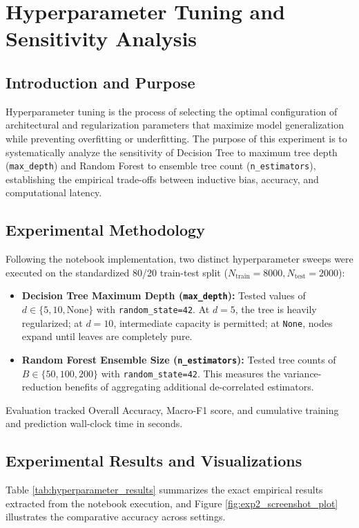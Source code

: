 \section{Hyperparameter Tuning and Sensitivity Analysis}
\label{sec:exp_hyperparameter}

\subsection{Introduction and Purpose}
Hyperparameter tuning is the process of selecting the optimal configuration of architectural and regularization parameters that maximize model generalization while preventing overfitting or underfitting. The purpose of this experiment is to systematically analyze the sensitivity of Decision Tree to maximum tree depth (\texttt{max\_depth}) and Random Forest to ensemble tree count (\texttt{n\_estimators}), establishing the empirical trade-offs between inductive bias, accuracy, and computational latency.

\subsection{Experimental Methodology}
Following the notebook implementation, two distinct hyperparameter sweeps were executed on the standardized 80/20 train-test split ($N_{\text{train}} = 8000, N_{\text{test}} = 2000$):
\begin{itemize}
    \item \textbf{Decision Tree Maximum Depth (\texttt{max\_depth}):} Tested values of $d \in \{5, 10, \text{None}\}$ with \texttt{random\_state=42}. At $d=5$, the tree is heavily regularized; at $d=10$, intermediate capacity is permitted; at \texttt{None}, nodes expand until leaves are completely pure.
    \item \textbf{Random Forest Ensemble Size (\texttt{n\_estimators}):} Tested tree counts of $B \in \{50, 100, 200\}$ with \texttt{random\_state=42}. This measures the variance-reduction benefits of aggregating additional de-correlated estimators.
\end{itemize}
Evaluation tracked Overall Accuracy, Macro-F1 score, and cumulative training and prediction wall-clock time in seconds.

\subsection{Experimental Results and Visualizations}
Table \ref{tab:hyperparameter_results} summarizes the exact empirical results extracted from the notebook execution, and Figure \ref{fig:exp2_screenshot_plot} illustrates the comparative accuracy across settings.

